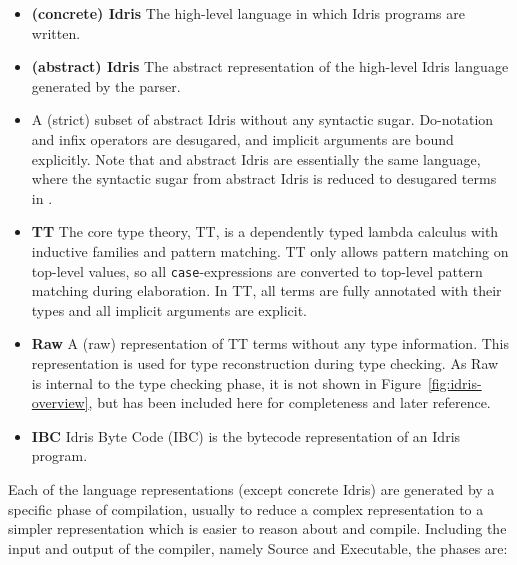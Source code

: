 \begin{itemize}
\item \textbf{(concrete) Idris}
The high-level language in which Idris programs are written.
\item \textbf{(abstract) Idris}
The abstract representation of the high-level Idris language generated by the parser.
\item \textbf{\IdrisM}
A (strict) subset of abstract Idris without any syntactic sugar. Do-notation and infix operators
are desugared, and implicit arguments are bound explicitly. Note that
\IdrisM{} and abstract Idris are essentially the same language, where the
syntactic sugar from abstract Idris is reduced to desugared terms in \IdrisM.
\item \textbf{TT}
The core type theory, TT, is a dependently typed lambda calculus with inductive
families and pattern matching. TT only allows pattern matching on top-level values,
so all \texttt{case}-expressions are converted to top-level pattern matching
during elaboration. In TT, all terms are fully annotated with their types and
all implicit arguments are explicit.
\item \textbf{Raw}
A (raw) representation of TT terms without any type information. This
representation is used for type reconstruction during type checking. As Raw is
internal to the type checking phase, it is not shown in
Figure~\ref{fig:idris-overview}, but has been included here for completeness and
later reference.
\item \textbf{IBC}
Idris Byte Code (IBC) is the bytecode representation of an Idris program.
\end{itemize}

Each of the language representations (except concrete Idris) are generated by a specific phase of
compilation, usually to reduce a complex representation to a simpler
representation which is easier to reason about and compile. Including the input
and output of the compiler, namely Source and Executable, the phases are:

